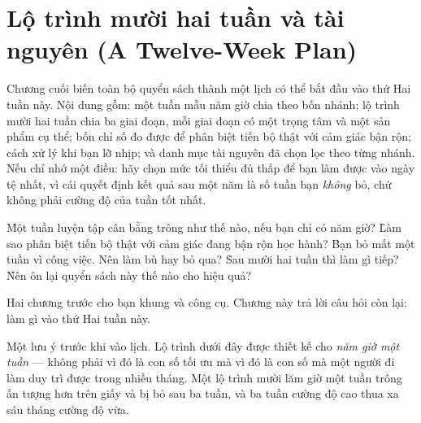\documentclass[../../english.tex]{subfiles}
\begin{document}
\chapter{Lộ trình mười hai tuần và tài nguyên (A Twelve-Week Plan)}

\begin{tomtat}
Chương cuối biến toàn bộ quyển sách thành một lịch có thể bắt đầu vào thứ Hai tuần này. Nội dung gồm: một tuần mẫu năm giờ chia theo bốn nhánh; lộ trình mười hai tuần chia ba giai đoạn, mỗi giai đoạn có một trọng tâm và một sản phẩm cụ thể; bốn chỉ số đo được để phân biệt tiến bộ thật với cảm giác bận rộn; cách xử lý khi bạn lỡ nhịp; và danh mục tài nguyên đã chọn lọc theo từng nhánh. Nếu chỉ nhớ một điều: hãy chọn mức tối thiểu đủ thấp để bạn làm được vào ngày tệ nhất, vì cái quyết định kết quả sau một năm là số tuần bạn \emph{không} bỏ, chứ không phải cường độ của tuần tốt nhất.
\end{tomtat}

\begin{nentang}
\end{nentang}

\begin{khoigoi}
\h{Một tuần luyện tập cân bằng trông như thế nào, nếu bạn chỉ có năm giờ?}
\h{Làm sao phân biệt tiến bộ thật với cảm giác đang bận rộn học hành?}
\h{Bạn bỏ mất một tuần vì công việc. Nên làm bù hay bỏ qua?}
\h{Sau mười hai tuần thì làm gì tiếp?}
\h{Nên ôn lại quyển sách này thế nào cho hiệu quả?}
\end{khoigoi}

Hai chương trước cho bạn khung và công cụ. Chương này trả lời câu hỏi còn lại: làm gì vào thứ Hai tuần này.

Một lưu ý trước khi vào lịch. Lộ trình dưới đây được thiết kế cho \emph{năm giờ một tuần} --- không phải vì đó là con số tối ưu mà vì đó là con số mà một người đi làm duy trì được trong nhiều tháng. Một lộ trình mười lăm giờ một tuần trông ấn tượng hơn trên giấy và bị bỏ sau ba tuần, và ba tuần cường độ cao thua xa sáu tháng cường độ vừa.
\end{document}
